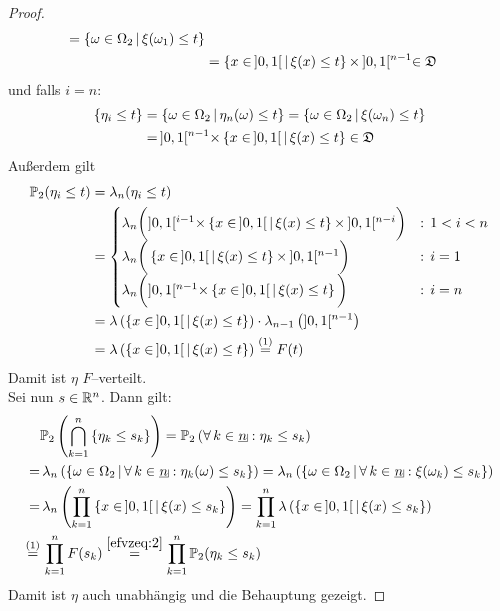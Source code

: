 \begin{proof}
\begin{align*}
 = \left\{\omega \in \Omega_2\,|\,\xi(\omega_1) \le t\right\}\\
 &= \left\{x \in\!\  ]0,1[\,|\,\xi(x) \le t\right\}\times\!\  ]0,1[^{n-1} \in \mathfrak{D}
\end{align*}
und falls $i = n$:
\begin{align*}
\left\{\eta_i \le t\right\} & = \left\{\omega \in \Omega_2\,|\,\eta_n(\omega) \le t\right\}
 = \left\{\omega \in \Omega_2\,|\,\xi(\omega_n) \le t\right\}\\
 &=\!\  ]0,1[^{n-1} \times \left\{x \in \!\ ]0,1[\,|\,\xi(x) \le t\right\}  \in \mathfrak{D}
\end{align*}
Außerdem gilt
\begin{align}
\mathbb{P}_2(\eta_i \le t) & = \lambda_n(\eta_i \le t) \notag\\
&= \begin{cases} 
\lambda_n\bigg(
]0,1[^{i-1}\times\left\{x\in\!\ ]0,1[\,|\,\xi(x)\le t\right\}\times\ \!]0,1[^{n-i} \bigg)
 & : \, 1 < i < n\notag\\
\lambda_n\bigg(
\left\{x \in\!\  ]0,1[\,|\,\xi(x) \le t\right\}\times\!\ ]0,1[^{n-1} \bigg) & : \,i = 1
\notag\\
\lambda_n\bigg(]0,1[^{n-1}\times\left\{x\in\!\  ]0,1[\,|\,\xi(x) \le t\right\} \bigg)&:\,
i=n\end{cases}\notag\\
&= \lambda\left(\left\{x \in\!\  ]0,1[\,|\,\xi(x) \le t\right\}\right) \cdot
 \lambda_{n-1}\left(]0,1[^{n-1} \right)\notag\\
 &= \lambda\left(\left\{x \in\!\  ]0,1[\,|\,\xi(x) \le t\right\}\right)
  \overset{(1)}= F(t) \label{efvzeq:2}
\end{align}
Damit ist $\eta$ $F$--verteilt.\\
Sei nun $s \in \mathbb{R}^n$. Dann gilt:
\begin{align*}
& \Prim_2\left(\bigcap_{k=1}^n \meng{\eta_k \le s_k}\right)
= \Prim_2\left(\forall\, k \in \haken n: \eta_k \le s_k\right)\\
 =&\, \lambda_n\left( \menge{\omega \in \Omega_2}
  {\forall\, k \in \haken n: \eta_k(\omega) \le s_k} \right)
= \lambda_n\left(\menge{\omega \in \Omega_2}
  {\forall\, k \in \haken n: \xi(\omega_k) \le s_k} \right) \\
= &\,\lambda_n \left(\prod_{k = 1}^n \menge{x \in \!\ ]0,1[}
  {\xi(x) \le s_k}\right)
= \prod_{k=1}^n \lambda\left(\menge{x \in\!\  ]0,1[}
  {\xi(x) \le s_k} \right)\\
\overset{(1)}=&\, \prod_{k=1}^n F(s_k) \overset{\eqref{efvzeq:2}}= 
\prod_{k=1}^n \Prim_2(\eta_k \le s_k)
\end{align*}
Damit ist $\eta$ auch unabhängig und die Behauptung gezeigt.
\end{proof}